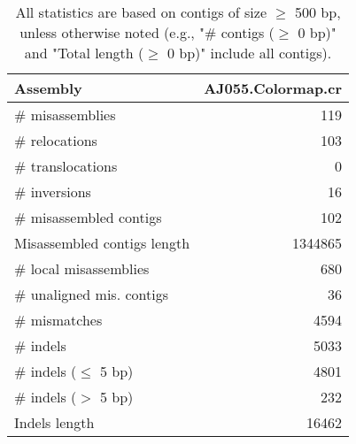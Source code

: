 \documentclass[12pt,a4paper]{article}
\begin{document}
\begin{table}[ht]
\begin{center}
\caption{All statistics are based on contigs of size $\geq$ 500 bp, unless otherwise noted (e.g., "\# contigs ($\geq$ 0 bp)" and "Total length ($\geq$ 0 bp)" include all contigs).}
\begin{tabular}{|l*{1}{|r}|}
\hline
Assembly & AJ055.Colormap.cr \\ \hline
\# misassemblies & 119 \\ \hline
\hspace{5mm}\# relocations & 103 \\ \hline
\hspace{5mm}\# translocations & 0 \\ \hline
\hspace{5mm}\# inversions & 16 \\ \hline
\# misassembled contigs & 102 \\ \hline
Misassembled contigs length & 1344865 \\ \hline
\# local misassemblies & 680 \\ \hline
\# unaligned mis. contigs & 36 \\ \hline
\# mismatches & 4594 \\ \hline
\# indels & 5033 \\ \hline
\hspace{5mm}\# indels ($\leq$ 5 bp) & 4801 \\ \hline
\hspace{5mm}\# indels ($>$ 5 bp) & 232 \\ \hline
Indels length & 16462 \\ \hline
\end{tabular}
\end{center}
\end{table}
\end{document}
